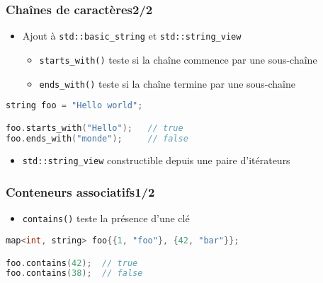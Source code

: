 \documentclass[C++.tex]{subfiles}
\begin{document}
\begin{frame}[fragile]
	\frametitle{Chaînes de caractères\titlehfill{}2/2}
	\begin{itemize}
		\item Ajout à \lstinline|std::basic_string| et \lstinline|std::string_view|
		\begin{itemize}
			\item \lstinline|starts_with()| teste si la chaîne commence par une sous-chaîne
			\item \lstinline|ends_with()| teste si la chaîne termine par une sous-chaîne
		\end{itemize}
	\end{itemize}

	\begin{lstlisting}[language=C++]
string foo = "Hello world";

foo.starts_with("Hello");   // true
foo.ends_with("monde");     // false\end{lstlisting}

	\begin{itemize}
		\item \lstinline|std::string_view| constructible depuis une paire d'itérateurs
	\end{itemize}
\end{frame}

\begin{frame}[fragile]
	\frametitle{Conteneurs associatifs\titlehfill{}1/2}
	\begin{itemize}
		\item \lstinline|contains()| teste la présence d'une clé

	\end{itemize}

	\begin{lstlisting}[language=C++]
map<int, string> foo{{1, "foo"}, {42, "bar"}};

foo.contains(42);  // true
foo.contains(38);  // false\end{lstlisting}
\end{frame}
\end{document}
